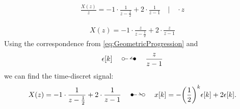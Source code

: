 \begin{align}
	\frac{X(z)}{z}=-1\cdot\frac{1}{z-\frac{1}{2}}+2\cdot\frac{1}{z-1} \quad\Bigg | \quad \cdot z
\end{align}

\begin{align}
	X(z)=-1\cdot\frac{z}{z-\frac{1}{2}}+2\cdot\frac{z}{z-1}
\end{align}
Using the correspondence from \ref{eq:GeometricProgression} and 
\begin{align}
	\epsilon[k]\quad\ztransf\quad\frac{z}{z-1}
\end{align}
we can find the time-discret signal:
\begin{align}
	X(z)=-1\cdot\frac{1}{z-\frac{1}{2}}+2\cdot\frac{1}{z-1}\quad\Ztransf\quad x[k]=-\bigg(\frac{1}{2}\bigg)^k\epsilon[k]+2\epsilon[k].
\end{align}
